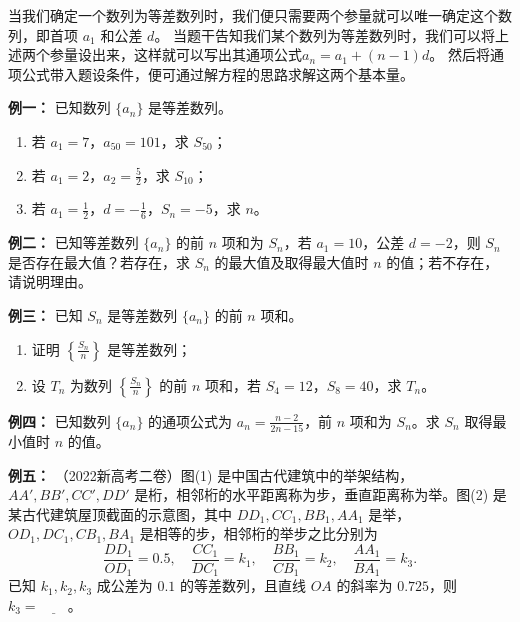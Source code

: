 \documentclass{article}
\begin{document}
\begin{tcolorbox}[colback=blue!10,colframe=blue!70!black,title=]
    当我们确定一个数列为等差数列时，我们便只需要两个参量就可以唯一确定这个数列，即首项 \(a_1\) 和公差 \(d\)。
    当题干告知我们某个数列为等差数列时，我们可以将上述两个参量设出来，这样就可以写出其通项公式$a_n = a_1 + (n-1)d$。
    然后将通项公式带入题设条件，便可通过解方程的思路求解这两个基本量。
\end{tcolorbox}




\noindent\textbf{例一： }已知数列 \(\{a_n\}\) 是等差数列。
\begin{enumerate}
    \item 若 \(a_1 = 7\)，\(a_{50} = 101\)，求 \(S_{50}\)；
    \item 若 \(a_1 = 2\)，\(a_2 = \frac{5}{2}\)，求 \(S_{10}\)；
    \item 若 \(a_1 = \frac{1}{2}\)，\(d = -\frac{1}{6}\)，\(S_n = -5\)，求 \(n\)。
\end{enumerate}
\vspace{10\baselineskip}

\noindent\textbf{例二： } 已知等差数列 \(\{a_n\}\) 的前 \(n\) 项和为 \(S_n\)，若 \(a_1 = 10\)，公差 \(d = -2\)，则 \(S_n\) 是否存在最大值？若存在，求 \(S_n\) 的最大值及取得最大值时 \(n\) 的值；若不存在，请说明理由。
\vspace{10\baselineskip}

\noindent\textbf{例三： }已知 \(S_n\) 是等差数列 \(\{a_n\}\) 的前 \(n\) 项和。

\begin{enumerate}
    \item 证明 \(\left\{\frac{S_n}{n}\right\}\) 是等差数列；
    \item 设 \(T_n\) 为数列 \(\left\{\frac{S_n}{n}\right\}\) 的前 \(n\) 项和，若 \(S_4 = 12\)，\(S_8 = 40\)，求 \(T_n\)。
\end{enumerate}
\newpage

\noindent\textbf{例四： }已知数列 \(\{a_n\}\) 的通项公式为 \(a_n = \frac{n-2}{2n-15}\)，前 \(n\) 项和为 \(S_n\)。求 \(S_n\) 取得最小值时 \(n\) 的值。
\vspace{10\baselineskip}

\noindent\textbf{例五： } （2022新高考二卷）图(1) 是中国古代建筑中的举架结构，$AA',BB',CC',DD'$ 是桁，相邻桁的水平距离称为步，垂直距离称为举。图(2) 是某古代建筑屋顶截面的示意图，其中 $DD_1,CC_1,BB_1,AA_1$ 是举，$OD_1,DC_1,CB_1,BA_1$ 是相等的步，相邻桁的举步之比分别为
\[
\frac{DD_1}{OD_1}=0.5,\quad \frac{CC_1}{DC_1}=k_1,\quad \frac{BB_1}{CB_1}=k_2,\quad \frac{AA_1}{BA_1}=k_3.
\]
已知 $k_1,k_2,k_3$ 成公差为 $0.1$ 的等差数列，且直线 $OA$ 的斜率为 $0.725$，则 $k_3 = \underline{\qquad}$。
\end{document}
